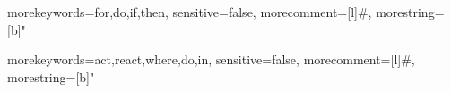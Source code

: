 
{
	morekeywords={for,do,if,then},
	sensitive=false,
	morecomment=[l]{\#},
	morestring=[b]"
}

{
	morekeywords={act,react,where,do,in},
	sensitive=false,
	morecomment=[l]{\#},
	morestring=[b]" 
}
